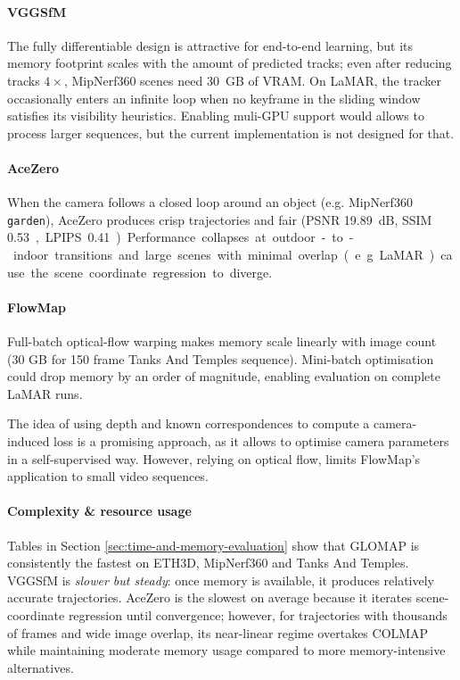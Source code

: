 \paragraph{VGGSfM}
The fully differentiable design is attractive for end-to-end learning, but its memory footprint scales with the amount of predicted tracks; even after reducing tracks $4\times$, MipNerf360 scenes need \SI{30}{GB} of VRAM.
On LaMAR, the tracker occasionally enters an infinite loop when no keyframe in the sliding window satisfies its visibility heuristics.
Enabling muli-GPU support would allows to process larger sequences, but the current implementation is not designed for that.

\paragraph{AceZero}
When the camera follows a closed loop around an object (e.g. MipNerf360 \texttt{garden}), AceZero produces crisp trajectories and fair (PSNR \SI{19.89}{dB}, SSIM \SI{0.53}, LPIPS \SI{0.41}).
Performance collapses at outdoor-to-indoor transitions and large scenes with minimal overlap (e.g. LaMAR) cause the scene coordinate regression to diverge.

\paragraph{FlowMap}
Full-batch optical-flow warping makes memory scale linearly with image count (30 GB for 150 frame Tanks And Temples sequence).
Mini-batch optimisation could drop memory by an order of magnitude, enabling evaluation on complete LaMAR runs.

The idea of using depth and known correspondences to compute a camera-induced loss is a promising approach, as it allows to optimise camera parameters in a self-supervised way. 
However, relying on optical flow, limits FlowMap's application to small video sequences. 

\paragraph{Complexity \& resource usage}
Tables in Section \ref{sec:time-and-memory-evaluation} show that GLOMAP is consistently the fastest on ETH3D, MipNerf360 and Tanks And Temples.
VGGSfM is \emph{slower but steady}: once memory is available, it produces relatively accurate trajectories.
AceZero is the slowest on average because it iterates scene-coordinate regression until convergence; however, for trajectories with thousands of frames and wide image overlap, its near-linear regime overtakes COLMAP while maintaining moderate memory usage compared to more memory-intensive alternatives.

